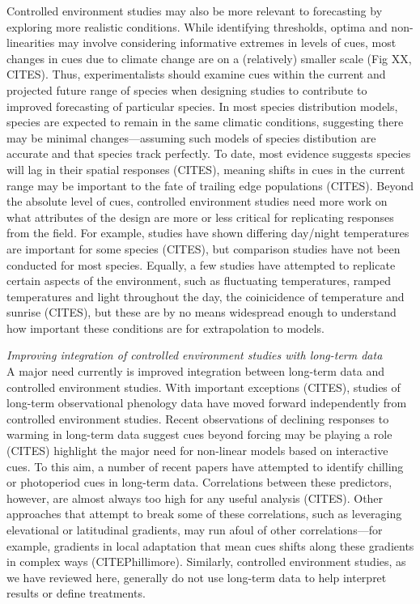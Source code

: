 \documentclass[11pt,letter]{article}
\begin{document}
Controlled environment studies may also be more relevant to forecasting by exploring more realistic conditions. While identifying thresholds, optima and non-linearities may involve considering informative extremes in levels of cues, most changes in cues due to climate change are on a (relatively) smaller scale (Fig XX, CITES). Thus, experimentalists should examine cues within the current and projected future range of species when designing studies to contribute to improved forecasting of particular species. In most species distribution models, species are expected to remain in the same climatic conditions, suggesting there may be minimal changes---assuming such models of species distibution are accurate and that species track perfectly. To date, most evidence suggests species will lag in their spatial responses (CITES), meaning shifts in cues in the current range may be important to the fate of trailing edge populations (CITES). Beyond the absolute level of cues, controlled environment studies need more work on what attributes of the design are more or less critical for replicating responses from the field. For example, studies have shown differing day/night temperatures are important for some species (CITES), but comparison studies have not been conducted for most species. Equally, a few studies have attempted to replicate certain aspects of the environment, such as fluctuating temperatures, ramped temperatures and light throughout the day, the coinicidence of temperature and sunrise (CITES), but these are by no means widespread enough to understand how important these conditions are for extrapolation to models. 

\emph{Improving integration of controlled environment studies with long-term data}\\
A major need currently is improved integration between long-term data and controlled environment studies. With important exceptions (CITES), studies of long-term observational phenology data have moved forward independently from controlled environment studies. Recent observations of declining responses to warming in long-term data suggest cues beyond forcing may be playing a role (CITES) highlight the major need for non-linear models based on interactive cues. To this aim, a number of recent papers have attempted to identify chilling or photoperiod cues in long-term data. Correlations between these predictors, however, are almost always too high for any useful analysis (CITES). Other approaches that attempt to break some of these correlations, such as leveraging elevational or latitudinal gradients, may run afoul of other correlations---for example, gradients in local adaptation that mean cues shifts along these gradients in complex ways (CITEPhillimore). Similarly, controlled environment studies, as we have reviewed here, generally do not use long-term data to help interpret results or define treatments. 
\end{document}
